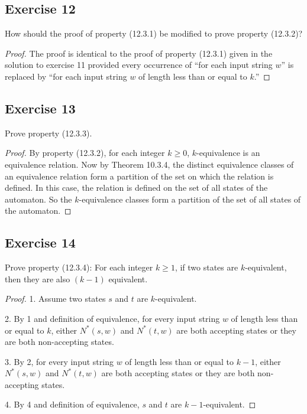 \documentclass[14pt]{extarticle}
\begin{document}
\subsection{Exercise 12}
How should the proof of property (12.3.1) be modified to prove property (12.3.2)?

\begin{proof}
    The proof is identical to the proof of property (12.3.1) given in the solution to exercise 11 provided every occurrence of
    “for each input string \(w\)” is replaced by “for each input string \(w\) of length less than or equal to \(k\).”
\end{proof}

\subsection{Exercise 13}
Prove property (12.3.3).
\begin{proof}
    By property (12.3.2), for each integer \(k \geq 0\), \(k\)-equivalence is an equivalence relation. Now by Theorem 10.3.4,
    the distinct equivalence classes of an equivalence relation form a partition of the set on which the relation is defined.
    In this case, the relation is defined on the set of all states of the automaton. So the \(k\)-equivalence classes form a
    partition of the set of all states of the automaton.
\end{proof}

\subsection{Exercise 14}
Prove property (12.3.4): For each integer \(k \geq 1\), if two states are \(k\)-equivalent, then they are also \((k - 1)\)
equivalent.

\begin{proof}
    1. Assume two states \(s\) and \(t\) are \(k\)-equivalent.

    2. By 1 and definition of equivalence, for every input string \(w\) of length less than or equal to \(k\), either
    \(N^*(s, w)\) and \(N^*(t, w)\) are both accepting states or they are both non-accepting states.

    3. By 2, for every input string \(w\) of length less than or equal to \(k-1\), either \(N^*(s, w)\) and \(N^*(t, w)\) are
    both accepting states or they are both non-accepting states.

    4. By 4 and definition of equivalence, \(s\) and \(t\) are \(k - 1\)-equivalent.
\end{proof}
\end{document}

